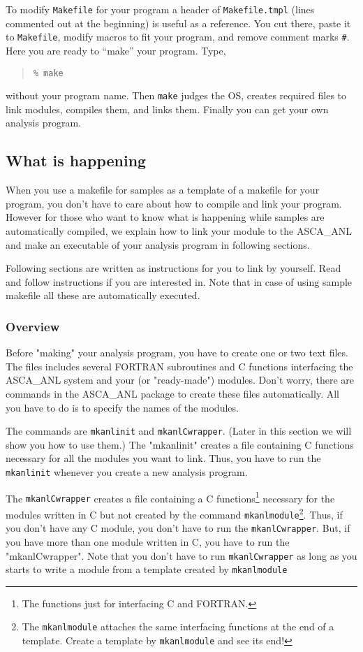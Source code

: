 To modify {\tt Makefile} for your program
a header of {\tt Makefile.tmpl} (lines commented out at the beginning)
is useful as a reference.
You cut there,
paste it to {\tt Makefile},
modify macros to fit your program,
and remove comment marks {\tt \#}.
Here you are ready to ``make'' your program.
Type,
\begin{quote}\baselineskip 3.2mm\begin{verbatim}
% make
\end{verbatim}\end{quote}
without your program name.
Then
{\tt make} judges the OS,
creates required files to link modules,
compiles them,
and links them.
Finally
you can get your own analysis program.

\subsection{What is happening}
When you use a makefile for samples
as a template of a makefile for your program,
you don't have to care about how to compile and link your program.
However for those who want to know what is happening
while samples are automatically compiled,
we explain how to link your module to the ASCA\_ANL
and make an executable of your analysis program
in following sections.

Following sections are written as instructions for you to link by yourself.
Read and follow instructions if you are interested in.
Note that
in case of using sample makefile
all these are automatically executed.

\subsubsection{Overview}
Before "making" your analysis program,
you have to create one or two text files.
The files includes several FORTRAN subroutines and C functions
interfacing the ASCA\_ANL system and your (or "ready-made")  
modules.
Don't worry,
there are commands in the ASCA\_ANL package
to create these files automatically.
All you have to do is to specify the names of the modules.

The commands are {\tt mkanlinit} and {\tt mkanlCwrapper}.
(Later in this section we will show you how to use them.)
The "mkanlinit" creates a file containing C functions
necessary for all the modules you want to link.
Thus,
you have to run the {\tt mkanlinit} whenever you create a new analysis  
program.

The {\tt mkanlCwrapper} creates a file containing a C functions\footnote{
The functions just for interfacing C and FORTRAN.
}
necessary for the modules written in C
but not created by the command {\tt mkanlmodule}\footnote{
The {\tt mkanlmodule} attaches the same interfacing functions
at the end of a template.
Create a template by {\tt mkanlmodule} and see its end!
}.
Thus,
if you don't have any C module,
you don't have to run the {\tt mkanlCwrapper}.
But,
if you have more than one module written in C,
you have to run the "mkanlCwrapper".
Note that
you don't have to run {\tt mkanlCwrapper}
as long as you starts to write a module
from a template created by {\tt mkanlmodule}

